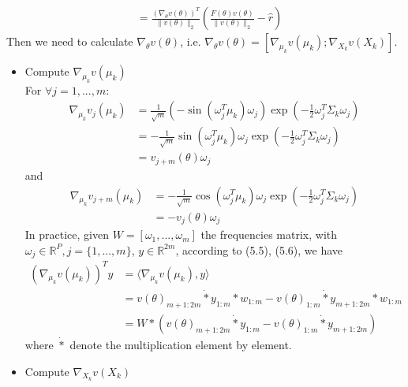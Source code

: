 \documentclass[12pt,a4paper]{article}
\begin{document}
\begin{itemize}
\begin{equation}
\begin{aligned}
                \\&=  \frac{(\nabla_\theta v(\theta) )^T }{\|v(\theta)\|_2} (\frac{F(\theta)v(\theta)}{\|v(\theta)\|_2} -\hat{r}) 
        \end{aligned}
    \end{equation}
Then we need to calculate $\nabla_{\theta} v(\theta)$, i.e. %
$\nabla_{\theta} v(\theta)  = [\nabla_{\mu_k} v(\mu_k);\nabla_{X_k} v(X_k)]$. 
\begin{itemize}
   \item Compute $\nabla_{\mu_k} v(\mu_k)$\\
   For $\forall j = 1,...,m$:
\begin{equation}
    \begin{aligned}
    \nabla_{\mu_k} v_j(\mu_k) &= \frac{1}{\sqrt{m}} (-\sin{(\omega_j^T\mu_k)}\omega_j)\exp(-\frac{1}{2}\omega_j^T \Sigma_k \omega_j)
        \\&= -\frac{1}{\sqrt{m}} \sin{(\omega_j^T\mu_k)}\omega_j\exp(-\frac{1}{2}\omega_j^T \Sigma_k \omega_j) 
        \\&= v_{j+m}(\theta) \omega_j
    \end{aligned}
\end{equation}
and 
\begin{equation}
\begin{aligned}
        \nabla_{\mu_k} v_{j+m}(\mu_k) &= -\frac{1}{\sqrt{m}} \cos{(\omega_j^T\mu_k)}\omega_j\exp(-\frac{1}{2}\omega_j^T \Sigma_k \omega_j)
    \\&=-v_j(\theta)\omega_j 
\end{aligned}
\end{equation}
In practice, given $W = [\omega_1,...,\omega_m]$ the frequencies matrix, with $\omega_j \in \mathbb{R}^P, j = \{1,...,m\} $, $y \in \mathbb{R}^{2m}$, according to (5.5), (5.6), we have
\begin{equation}
    \begin{aligned}
        (\nabla_{\mu_k} v(\mu_k) )^T y &= \langle \nabla_{\mu_k} v(\mu_k) , y \rangle \\&=
        v(\theta)_{m+1:2m} \dot* y_{1:m} * w_{1:m} - v(\theta)_{1:m} \dot* y_{m+1:2m} * w_{1:m}
        \\&= W*(v(\theta)_{m+1:2m} \dot* y_{1:m} - v(\theta)_{1:m} \dot* y_{m+1:2m})
    \end{aligned}
\end{equation}
where $\dot*$ denote the multiplication element by element.
\item Compute $\nabla_{X_k} v(X_k)$ \\

\end{itemize}
\end{itemize}
\end{document}
